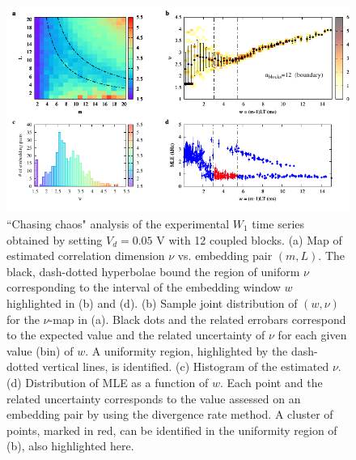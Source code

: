 \begin{figure}[H]
    \centering
    \includegraphics[width=\linewidth]{../blocks/12_blocks/2e5_points/plots/chaos_low.pdf}
    \caption{``Chasing chaos" analysis of the experimental $W_1$ time series obtained by setting $V_d=0.05$ V with 12 coupled blocks.
    (a) Map of estimated correlation dimension $\nu$ vs. embedding pair $(m, L)$.
    The black, dash-dotted hyperbolae bound the region of uniform $\nu$ corresponding to the interval of the
    embedding window $w$ highlighted in (b) and (d).
    (b) Sample joint distribution of $(w,\nu)$ for the $\nu$-map in (a).
    Black dots and the related errobars correspond to the expected value and the related uncertainty of $\nu$
    for each given value (bin) of $w$. A uniformity region, highlighted by the dash-dotted vertical lines,
    is identified. (c) Histogram of the estimated $\nu$. (d) Distribution of MLE as a function of $w$. Each point and the related
    uncertainty corresponds to the value assessed on an embedding pair by using the divergence rate method.
    A cluster of points, marked in red, can be identified in the uniformity region of (b), also highlighted here.}
    \label{fig:12 blocks chaos}
\end{figure}


